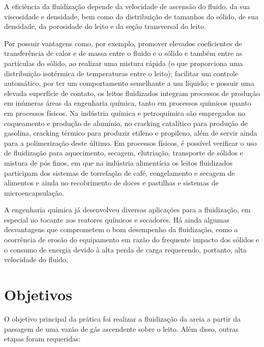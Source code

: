 A eficiência da fluidização depende da velocidade de ascensão do fluido, da sua viscosidade e densidade, bem como da distribuição de tamanhos do sólido, de sua densidade, da porosidade do leito e da seção transversal do leito.

Por possuir vantagens como, por exemplo, promover elevados coeficientes de transferência de calor e de massa entre o fluido e o sólido e também entre as partículas do sólido, ao realizar uma mistura rápida (o que proporciona uma distribuição isotérmica  de temperaturas entre o leito); facilitar um controle automático, por ter um comportamento semelhante a um líquido; e possuir uma elevada superfície de contato, os leitos fluidizados integram processos de produção em inúmeras áreas da engenharia química, tanto em processos químicos quanto em processos físicos. Na indústria química e petroquímica são empregados no coqueamento e produção de alumínio, no cracking catalítico para produção de gasolina, cracking térmico para produzir etileno e propileno, além de servir ainda para a polimerização deste último. Em processos físicos, é possível verificar o uso de fluidização para aquecimento, secagem, elutriação, transporte de sólidos e mistura de pós finos, em que na indústria alimentícia os leitos fluidizados participam dos sistemas de torrefação de café, congelamento e secagem de alimentos e ainda no recobrimento de doces e pastilhas e sistemas de microencapsulação.

A engenharia química já desenvolveu diversas aplicações para a fluidização, em especial no tocante aos reatores químicos e secadores. Há ainda algumas desvantagens que comprometem o bom desempenho da fluidização, como a ocorrência de erosão do equipamento em razão do frequente impacto dos sólidos e o consumo de energia devido à alta perda de carga requerendo, portanto, alta velocidade do fluido.


\chapter{Objetivos}

O objetivo principal da prática foi realizar a fluidização da areia a partir da passagem de uma vazão de gás ascendente sobre o leito. Além disso, outras etapas foram requeridas:


